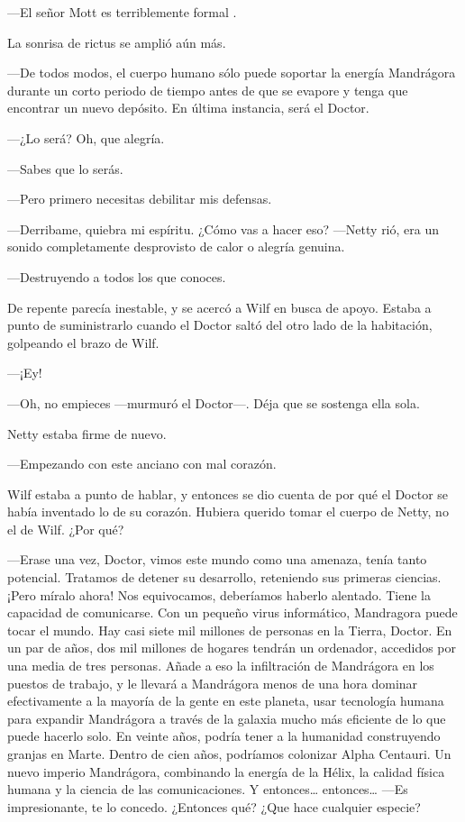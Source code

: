 ---El señor Mott es terriblemente formal .

La sonrisa de rictus se amplió aún más.

---De todos modos, el cuerpo humano sólo puede soportar la energía
Mandrágora durante un corto periodo de tiempo antes de que se evapore y
tenga que encontrar un nuevo depósito. En última instancia, será el
Doctor.

---¿Lo será? Oh, que alegría.

---Sabes que lo serás.

---Pero primero necesitas debilitar mis defensas.

---Derribame, quiebra mi espíritu. ¿Cómo vas a hacer eso? ---Netty rió,
era un sonido completamente desprovisto de calor o alegría genuina.

---Destruyendo a todos los que conoces.

De repente parecía inestable, y se acercó a Wilf en busca de apoyo.
Estaba a punto de suministrarlo cuando el Doctor saltó del otro lado de
la habitación, golpeando el brazo de Wilf.

---¡Ey!

---Oh, no empieces ---murmuró el Doctor---. Déja que se sostenga ella
sola.

Netty estaba firme de nuevo.

---Empezando con este anciano con mal corazón.

Wilf estaba a punto de hablar, y entonces se dio cuenta de por qué el
Doctor se había inventado lo de su corazón. Hubiera querido tomar el
cuerpo de Netty, no el de Wilf. ¿Por qué?

---Erase una vez, Doctor, vimos este mundo como una amenaza, tenía tanto
potencial. Tratamos de detener su desarrollo, reteniendo sus primeras
ciencias. ¡Pero míralo ahora! Nos equivocamos, deberíamos haberlo
alentado. Tiene la capacidad de comunicarse. Con un pequeño virus
informático, Mandragora puede tocar el mundo. Hay casi siete mil
millones de personas en la Tierra, Doctor. En un par de años, dos mil
millones de hogares tendrán un ordenador, accedidos por una media de
tres personas. Añade a eso la infiltración de Mandrágora en los puestos
de trabajo, y le llevará a Mandrágora menos de una hora dominar
efectivamente a la mayoría de la gente en este planeta, usar tecnología
humana para expandir Mandrágora a través de la galaxia mucho más
eficiente de lo que puede hacerlo solo. En veinte años, podría tener a
la humanidad construyendo granjas en Marte. Dentro de cien años,
podríamos colonizar Alpha Centauri. Un nuevo imperio Mandrágora,
combinando la energía de la Hélix, la calidad física humana y la ciencia
de las comunicaciones. Y entonces\ldots{} entonces\ldots{} ---Es
impresionante, te lo concedo. ¿Entonces qué? ¿Que hace cualquier
especie?

